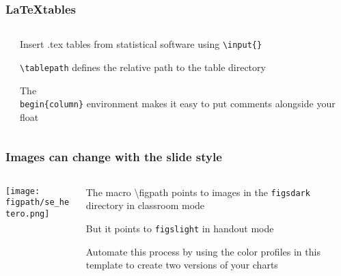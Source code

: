 \documentclass[aspectratio=169,handout]{beamer}
\begin{document}
\begin{frame}
	\frametitle{\LaTeX tables}
	\begin{columns}[T] %
	\begin{column}{.48\textwidth}
		
	\end{column}%
	\hfill%
	\begin{column}{.48\textwidth}
		\begin{witem}
		\item Insert .tex tables from statistical software
			using \texttt{\textbackslash{}input\{\}}
		\item \texttt{\textbackslash{}tablepath} defines the relative path to
			the table directory
		\item The \texttt{\\begin\{column\}} environment
			makes it easy to put comments alongside your float
	\end{witem}
	\end{column}%
	\end{columns}
\end{frame}


\begin{frame}
	\frametitle{Images can change with the slide style}
	\begin{columns}[T] %
	\begin{column}{.48\textwidth}
		\texttt{[image: \\figpath/se\_hetero.png]}
	\end{column}%
	\hfill%
	\begin{column}{.48\textwidth}
		\begin{witem}
		\item The macro {\textbackslash{}figpath} points to images in the
			\texttt{figs\textunderscore{}dark} directory in classroom mode
		\item But it points to \texttt{figs\textunderscore{}light} in handout mode
		\item Automate this process by using the color profiles in this template
			to create two versions of your charts
	\end{witem}
	\end{column}%
	\end{columns}
\end{frame}
\end{document}
